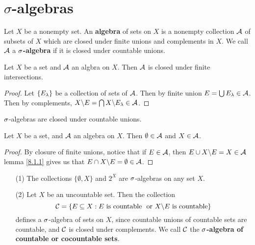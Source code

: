 \section{$\sigma$-algebras}

\begin{definition}
    Let $X$ be a nonempty set. An  \textbf{algebra} of sets on $X$ is a nonempty
    collection  $\mathcal{A}$ of subsets of $X$ which are closed under finite unions and
    complements in $X$. We call  $\mathcal{A}$ a \textbf{$\sigma$-algebra} if it is closed
    under countable unions.
\end{definition}

\begin{lemma}\label{8.1.1}
    Let $X$ be a set and $\mathcal{A}$ an algbra on $X$. Then $\mathcal{A}$ is closed under
    finite intersections.
\end{lemma}
\begin{proof}
    Let $\{E_\lambda\}$ be a collection of sets of $\mathcal{A}$. Then by finite union
    $E=\bigcup{E_\lambda} \in \mathcal{A}$. Then by complements,
    $X \backslash E=\bigcap{X \backslash E_\lambda} \in \mathcal{A}$.
\end{proof}
\begin{corollary}
    $\sigma$-algebras are closed under countable unions.
\end{corollary}

\begin{lemma}\label{8.1.2}
    Let $X$ be a set, and $\mathcal{A}$ an algebra on $X$. Then $\emptyset \in \mathcal{A}$ and
    $X \in \mathcal{A}$.
\end{lemma}
\begin{proof}
    By closure of finite unions, notice that if $E \in \mathcal{A}$, then
    $E \cup X \backslash E = X \in \mathcal{A}$ lemma \ref{8.1.1} gives us that $E \cap
    X \backslash E=\emptyset \in \mathcal{A}$.
\end{proof}

\begin{example}\label{example_8.1}
    \begin{enumerate}
        \item[(1)] The collections $\{\emptyset, X\}$ and $2^X$ are
            $\sigma$-algebras on any set $X$.

        \item[(2)] Let $X$ be an uncountable set. Then the collection
            \begin{equation*}
                \mathcal{C}=\{E \subseteq X : E \text{ is countable } \text{ or }
                X \backslash E \text{ is countable}\}
            \end{equation*}
            defines a $\sigma$-algebra of sets on $X$, since countable unions of
            countable sets are countable, and $\mathcal{C}$ is closed under complements.
            We call $\mathcal{C}$ the \textbf{$\sigma$-algebra of countable or cocountable
            sets}.
    \end{enumerate}
\end{example}


